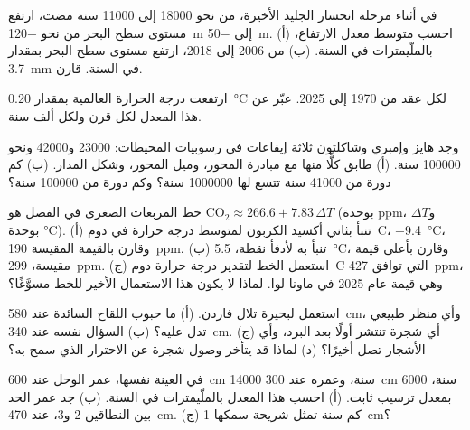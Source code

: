 \begin{exercise}[$\star$]\label{exo:g12:past-climates:3}
في أثناء مرحلة انحسار الجليد الأخيرة، من نحو \num{18000} إلى \num{11000}
سنة مضت، ارتفع مستوى سطح البحر من نحو \qty{-120}{m} إلى \qty{-50}{m}. (أ) احسب
متوسط معدل الارتفاع، بالملّيمترات في السنة. (ب) من 2006 إلى 2018، ارتفع مستوى
سطح البحر بمقدار \qty{3.7}{mm} في السنة. قارن.
\end{exercise}

\begin{exercise}[$\star$]\label{exo:g12:past-climates:4}
ارتفعت درجة الحرارة العالمية بمقدار \qty{0.20}{\degreeCelsius} لكل عقد من
1970 إلى 2025. عبّر عن هذا المعدل لكل قرن ولكل ألف سنة.
\end{exercise}

\begin{exercise}[$\star$]\label{exo:g12:past-climates:5}
وجد هايز وإمبري وشاكلتون ثلاثة إيقاعات في رسوبيات المحيطات:
\num{23000} و\num{42000} ونحو \num{100000} سنة. (أ) طابق كلًّا منها مع
مبادرة المحور، وميل المحور، وشكل المدار.
(ب) كم دورة من \num{41000} سنة تتسع لها \num{1000000} سنة؟ وكم
دورة من \num{100000} سنة؟
\end{exercise}

\begin{exercise}[$\star\star$]\label{exo:g12:past-climates:6}
خط المربعات الصغرى في الفصل هو $\mathrm{CO_2} \approx 266.6 +
7.83\,\Delta T$ (بوحدة ppm، و$\Delta T$ بوحدة \unit{\degreeCelsius}).
(أ) تنبأ بثاني أكسيد الكربون لمتوسط درجة حرارة  في دوم~C، \qty{-9.4}{\degreeCelsius}، وقارن بالقيمة المقيسة
\qty{190}{ppm}. (ب) تنبأ به لأدفأ نقطة، \qty{+5.5}{\degreeCelsius}،
وقارن بأعلى قيمة مقيسة، \qty{299}{ppm}. (ج) استعمل الخط
لتقدير درجة حرارة دوم~C التي توافق \qty{427}{ppm}، وهي
قيمة عام 2025 في ماونا لوا. لماذا لا يكون هذا الاستعمال الأخير للخط مسوَّغًا؟
\end{exercise}

\begin{exercise}[$\star\star$]\label{exo:g12:past-climates:7}
استعمل  لبحيرة تلال فاردن. (أ) ما حبوب اللقاح
السائدة عند \qty{580}{cm}، وأي منظر طبيعي تدل عليه؟ (ب) السؤال نفسه
عند \qty{340}{cm}. (ج) أي شجرة تنتشر أولًا بعد البرد،
وأي الأشجار تصل أخيرًا؟ (د) لماذا قد يتأخر وصول شجرة عن
الاحترار الذي سمح به؟
\end{exercise}

\begin{exercise}[$\star\star$]\label{exo:g12:past-climates:8}
في العينة نفسها، عمر الوحل عند \qty{600}{cm} \num{14000} سنة، وعمره
عند \qty{300}{cm} \num{6000} سنة، بمعدل ترسيب ثابت.
(أ) احسب هذا المعدل بالملّيمترات في السنة. (ب) جد عمر الحد
بين النطاقين 2 و3، عند \qty{470}{cm}. (ج) كم سنة تمثل شريحة
سمكها \qty{1}{cm}؟
\end{exercise}

